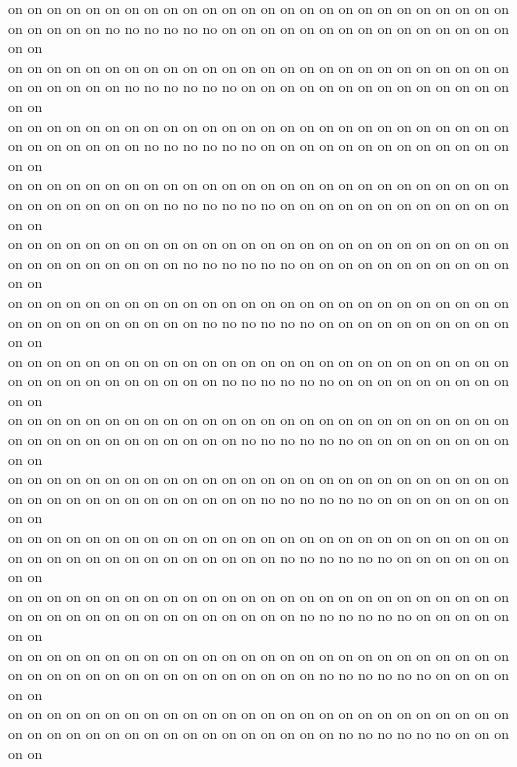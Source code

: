 on on on on on on on on on on on on on on on on on on on on on on on on on on on on on on on no no no no no no on on on on on on on on on on on on on on on on on\\
on on on on on on on on on on on on on on on on on on on on on on on on on on on on on on on on no no no no no no on on on on on on on on on on on on on on on on\\
on on on on on on on on on on on on on on on on on on on on on on on on on on on on on on on on on no no no no no no on on on on on on on on on on on on on on on\\
on on on on on on on on on on on on on on on on on on on on on on on on on on on on on on on on on on no no no no no no on on on on on on on on on on on on on on\\
on on on on on on on on on on on on on on on on on on on on on on on on on on on on on on on on on on on no no no no no no on on on on on on on on on on on on on\\
on on on on on on on on on on on on on on on on on on on on on on on on on on on on on on on on on on on on no no no no no no on on on on on on on on on on on on\\
on on on on on on on on on on on on on on on on on on on on on on on on on on on on on on on on on on on on on no no no no no no on on on on on on on on on on on\\
on on on on on on on on on on on on on on on on on on on on on on on on on on on on on on on on on on on on on on no no no no no no on on on on on on on on on on\\
on on on on on on on on on on on on on on on on on on on on on on on on on on on on on on on on on on on on on on on no no no no no no on on on on on on on on on\\
on on on on on on on on on on on on on on on on on on on on on on on on on on on on on on on on on on on on on on on on no no no no no no on on on on on on on on\\
on on on on on on on on on on on on on on on on on on on on on on on on on on on on on on on on on on on on on on on on on no no no no no no on on on on on on on\\
on on on on on on on on on on on on on on on on on on on on on on on on on on on on on on on on on on on on on on on on on on no no no no no no on on on on on on\\
on on on on on on on on on on on on on on on on on on on on on on on on on on on on on on on on on on on on on on on on on on on no no no no no no on on on on on\\
